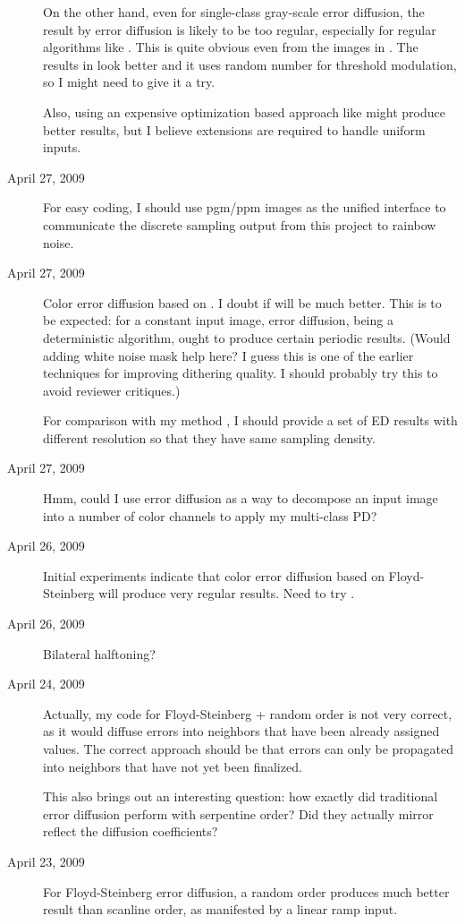 \begin{description}
{On the other hand, even for single-class gray-scale error diffusion, the result by error diffusion is likely to be too regular, especially for regular algorithms like \cite{Ostromoukhov:2001:SEE,Zhou:2003:IMT}.
This is quite obvious even from the images in \cite{Ostromoukhov:2001:SEE}.
The results in \cite{Zhou:2003:IMT} look better and it uses random number for threshold modulation, so I might need to give it a try.

Also, using an expensive optimization based approach like \cite{Pang:2008:SAH} might produce better results, but I believe extensions are required to handle uniform inputs.
}
\item[April 27, 2009]
{
For easy coding, I should use pgm/ppm images as the unified interface to communicate the discrete sampling output from this project to rainbow noise.
}
\item[April 27, 2009]
{
Color error diffusion based on \cite{Ostromoukhov:2001:SEE}.
I doubt if \cite{Zhou:2003:IMT} will be much better.
This is to be expected: for a constant input image, error diffusion, being a deterministic algorithm, ought to produce certain periodic results.
(Would adding white noise mask help here? I guess this is one of the earlier techniques for improving dithering quality. I should probably try this to avoid reviewer critiques.)

For comparison with my method \cite{Wei:2009:MPDS}, I should provide a set of ED results with different resolution so that they have same sampling density.
}
\item[April 27, 2009]
{
Hmm, could I use error diffusion as a way to decompose an input image into a number of color channels to apply my multi-class PD?
}
\item[April 26, 2009]
{
Initial experiments indicate that color error diffusion based on Floyd-Steinberg will produce very regular results.
Need to try \cite{Ostromoukhov:2001:SEE,Zhou:2003:IMT}.
}
\item[April 26, 2009]
{
Bilateral halftoning?
}
\item[April 24, 2009]
{
Actually, my code for Floyd-Steinberg + random order is not very correct, as it would diffuse errors into neighbors that have been already assigned values.
The correct approach should be that errors can only be propagated into neighbors that have not yet been finalized.

This also brings out an interesting question: how exactly did traditional error diffusion perform with serpentine order? Did they actually mirror reflect the diffusion coefficients?
}
\item[April 23, 2009]
{
For Floyd-Steinberg error diffusion, a random order produces much better result than scanline order, as manifested by a linear ramp input.

}
\end{description}
